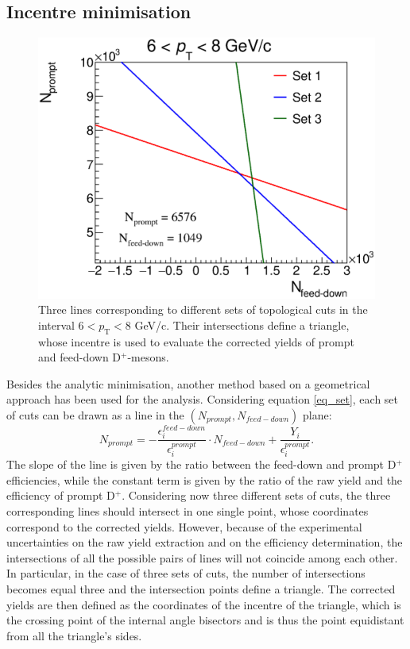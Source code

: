 \documentclass[b5paper,10pt,twoside,oldstyle,classica]{toptesi}
\newcommand{\pt}{p_\text{T}}
\begin{document}
\subsection{Incentre minimisation}
\begin{figure}[b]
\begin{center}
\includegraphics[scale = 0.35]{Lines_6-8.eps}
\caption{Three lines corresponding to different sets of topological cuts in the interval $6<\pt<8$ GeV/c. Their intersections define a triangle, whose incentre is used to evaluate the corrected yields of prompt and feed-down D$^+$-mesons.}
\label{lines}
\end{center}
\end{figure}
Besides the analytic minimisation, another method based on a geometrical approach has been used for the analysis. Considering equation \ref{eq_set}, each set of cuts can be drawn as a line in the $(N_{prompt},N_{feed-down})$ plane:
\begin{equation}
 N_{prompt} = -\frac{\epsilon^{feed-down}_i}{\epsilon^{prompt}_i} \cdot N_{feed-down} + \frac{Y_i}{\epsilon^{prompt}_i}.
\end{equation}
The slope of the line is given by the ratio between the feed-down and prompt D$^+$ efficiencies, while the constant term is given by the ratio of the raw yield and the efficiency of prompt D$^+$. Considering now three different sets of cuts, the three corresponding lines should intersect in one single point, whose coordinates correspond to the corrected yields. However, because of the experimental uncertainties on the raw yield extraction and on the efficiency determination, the intersections of all the possible pairs of lines will not coincide among each other. In particular, in the case of three sets of cuts, the number of intersections becomes equal three and the intersection points define a triangle. The corrected yields are then defined as the coordinates of the incentre of the triangle, which is the crossing point of the internal angle bisectors and is thus the point equidistant from all the triangle's sides. 
\end{document}
